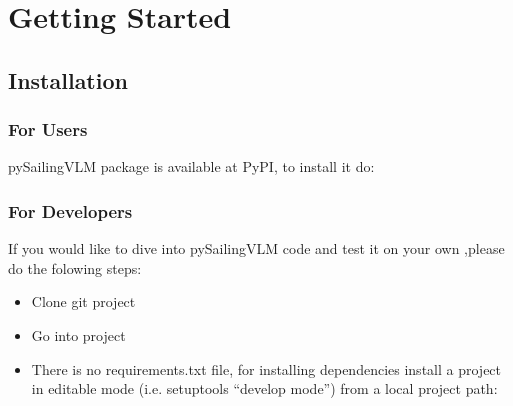 \documentclass[letterpaper,10pt,english]{jupyterBook}
\begin{document}
\part{Getting Started}

\sphinxstepscope


\chapter{Installation}
\label{\detokenize{chapters/installation:installation}}\label{\detokenize{chapters/installation::doc}}

\section{For Users}
\label{\detokenize{chapters/installation:for-users}}
\sphinxAtStartPar
pySailingVLM package is available at PyPI, to install it do:

\begin{sphinxVerbatim}[commandchars=\\\{\}]
  
\end{sphinxVerbatim}


\section{For Developers}
\label{\detokenize{chapters/installation:for-developers}}
\sphinxAtStartPar
If you would like to dive into pySailingVLM code and test it on your own ,please do the folowing steps:
\begin{itemize}
\item {} 
\sphinxAtStartPar
Clone git project

\end{itemize}

\begin{sphinxVerbatim}[commandchars=\\\{\}]
  
\end{sphinxVerbatim}
\begin{itemize}
\item {} 
\sphinxAtStartPar
Go into project

\end{itemize}

\begin{sphinxVerbatim}[commandchars=\\\{\}]
 
\end{sphinxVerbatim}
\begin{itemize}
\item {} 
\sphinxAtStartPar
There is no requirements.txt file, for installing dependencies install a project in editable mode (i.e. setuptools “develop mode”) from a local project path:

\end{itemize}
\end{document}
